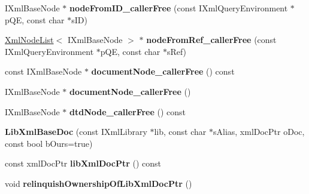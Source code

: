 \begin{DoxyCompactItemize}
\item 
\hypertarget{classgeneral__server_1_1LibXmlBaseDoc_a19b327cff1deb08c0d79c71262ffd071}{\-I\-Xml\-Base\-Node $\ast$ {\bfseries node\-From\-I\-D\-\_\-caller\-Free} (const \-I\-Xml\-Query\-Environment $\ast$p\-Q\-E, const char $\ast$s\-I\-D)}\label{classgeneral__server_1_1LibXmlBaseDoc_a19b327cff1deb08c0d79c71262ffd071}

\item 
\hypertarget{classgeneral__server_1_1LibXmlBaseDoc_a8d4199931ab9c447da0b106a8460596f}{\hyperlink{classgeneral__server_1_1XmlNodeList}{\-Xml\-Node\-List}$<$ \-I\-Xml\-Base\-Node $>$ $\ast$ {\bfseries node\-From\-Ref\-\_\-caller\-Free} (const \-I\-Xml\-Query\-Environment $\ast$p\-Q\-E, const char $\ast$s\-Ref)}\label{classgeneral__server_1_1LibXmlBaseDoc_a8d4199931ab9c447da0b106a8460596f}

\item 
\hypertarget{classgeneral__server_1_1LibXmlBaseDoc_ab7ca2e5cec1716d3f12ba3f49131c523}{const \-I\-Xml\-Base\-Node $\ast$ {\bfseries document\-Node\-\_\-caller\-Free} () const }\label{classgeneral__server_1_1LibXmlBaseDoc_ab7ca2e5cec1716d3f12ba3f49131c523}

\item 
\hypertarget{classgeneral__server_1_1LibXmlBaseDoc_a09255d3ef3450fafe82bc272877d654c}{\-I\-Xml\-Base\-Node $\ast$ {\bfseries document\-Node\-\_\-caller\-Free} ()}\label{classgeneral__server_1_1LibXmlBaseDoc_a09255d3ef3450fafe82bc272877d654c}

\item 
\hypertarget{classgeneral__server_1_1LibXmlBaseDoc_a7e3a5c3729dd2c1175aebfc6bbe24b9d}{\-I\-Xml\-Base\-Node $\ast$ {\bfseries dtd\-Node\-\_\-caller\-Free} () const }\label{classgeneral__server_1_1LibXmlBaseDoc_a7e3a5c3729dd2c1175aebfc6bbe24b9d}

\item 
\hypertarget{classgeneral__server_1_1LibXmlBaseDoc_a4f40b797d345b298b12bf0610136eafe}{{\bfseries \-Lib\-Xml\-Base\-Doc} (const \-I\-Xml\-Library $\ast$lib, const char $\ast$s\-Alias, xml\-Doc\-Ptr o\-Doc, const bool b\-Ours=true)}\label{classgeneral__server_1_1LibXmlBaseDoc_a4f40b797d345b298b12bf0610136eafe}

\item 
\hypertarget{classgeneral__server_1_1LibXmlBaseDoc_ad5219d74bc328a913792af99e7aa8f79}{const xml\-Doc\-Ptr {\bfseries lib\-Xml\-Doc\-Ptr} () const }\label{classgeneral__server_1_1LibXmlBaseDoc_ad5219d74bc328a913792af99e7aa8f79}

\item 
\hypertarget{classgeneral__server_1_1LibXmlBaseDoc_ac2cfb67d5817383ef5a1852f680a1bcb}{void {\bfseries relinquish\-Ownership\-Of\-Lib\-Xml\-Doc\-Ptr} ()}\label{classgeneral__server_1_1LibXmlBaseDoc_ac2cfb67d5817383ef5a1852f680a1bcb}

\end{DoxyCompactItemize}
